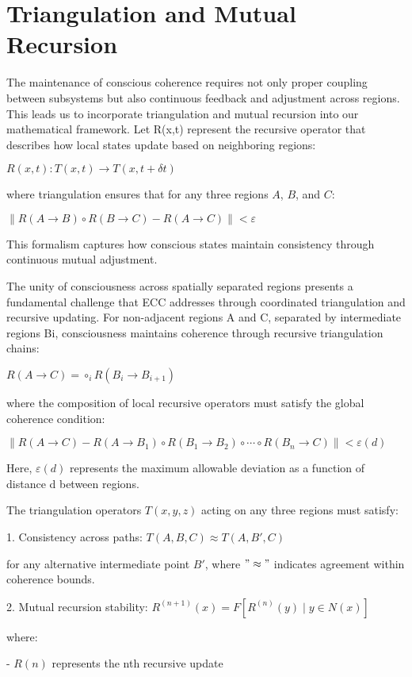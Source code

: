 \section{Triangulation and Mutual Recursion}

The maintenance of conscious coherence requires not only proper coupling between subsystems but also continuous feedback and adjustment across regions. This leads us to incorporate triangulation and mutual recursion into our mathematical framework. Let R(x,t) represent the recursive operator that describes how local states update based on neighboring regions:

$R(x,t): T(x,t) \rightarrow T(x,t + \delta t)$

where triangulation ensures that for any three regions $A$, $B$, and $C$:

$\|R(A \rightarrow B) \circ R(B \rightarrow C) - R(A \rightarrow C)\| < \varepsilon$

This formalism captures how conscious states maintain consistency through continuous mutual adjustment.

The unity of consciousness across spatially separated regions presents a fundamental challenge that ECC addresses through coordinated triangulation and recursive updating. For non-adjacent regions A and C, separated by intermediate regions {Bi}, consciousness maintains coherence through recursive triangulation chains:

$R(A \rightarrow C) = \circ_{i} R(B_i \rightarrow B_{i+1})$

where the composition of local recursive operators must satisfy the global coherence condition:

$\|R(A \rightarrow C) - R(A \rightarrow B_1) \circ R(B_1 \rightarrow B_2) \circ \cdots \circ R(B_n \rightarrow C)\| < \varepsilon(d)$

Here, $\varepsilon(d)$ represents the maximum allowable deviation as a function of distance d between regions.

The triangulation operators $T(x,y,z)$ acting on any three regions must satisfy:

1. Consistency across paths:
$T(A,B,C) \approx T(A,B',C)$

for any alternative intermediate point $B'$, where $"\approx"$ indicates agreement within coherence bounds.

2. Mutual recursion stability:
$R^{(n+1)}(x) = F[R^{(n)}(y) \mid y \in N(x)]$

where:

- $R(n)$ represents the nth recursive update

